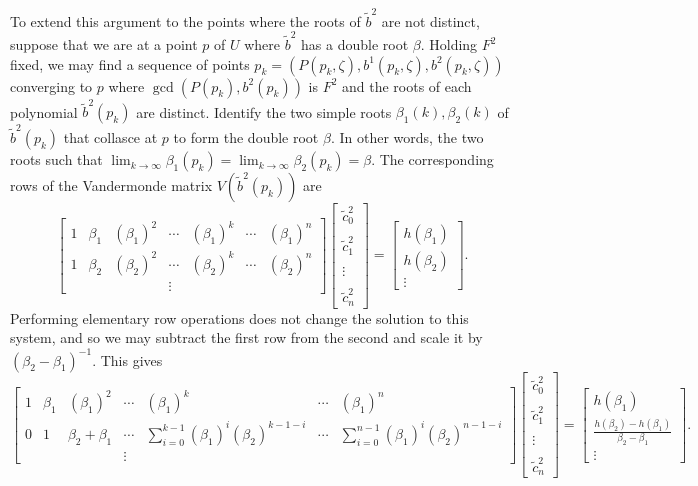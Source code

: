 To extend this argument to the points where the roots of $\tilde{b}^2$ are not distinct, suppose that we are at a point $p$ of $U$ where $\tilde{b}^2$ has a double root $β$. Holding $F^2$ fixed, we may find a sequence of points $p_k = (P(p_k, ζ), b^1(p_k,ζ), b^2(p_k,ζ))$ converging to $p$ where $\gcd(P(p_k),b^2(p_k))$ is $F^2$ and the roots of each polynomial $\tilde{b}^2(p_k)$ are distinct. Identify the two simple roots $β_1(k),β_2(k)$ of $\tilde{b}^2(p_k)$ that collasce at $p$ to form the double root $β$. In other words, the two roots such that $\lim_{k\to\infty} β_1(p_k) = \lim_{k\to\infty} β_2(p_k) = β$. The corresponding rows of the Vandermonde matrix $V(\tilde{b}^2(p_k))$ are
\[
\begin{bmatrix}
1 & β_1 & (β_1)^2 & \cdots & (β_1)^{k} & \cdots & (β_1)^{n} \\
1 & β_2 & (β_2)^2 & \cdots & (β_2)^{k} & \cdots & (β_2)^{n} \\
&&&\vdots&&&
\end{bmatrix}
\begin{bmatrix}
\tilde{c}^2_0 \\~\\ \tilde{c}^2_1 \\~\\ \vdots \\~\\ \tilde{c}^2_n
\end{bmatrix}
=
\begin{bmatrix}
h(β_1) \\
h(β_2) \\
\vdots
\end{bmatrix}.
\]
Performing elementary row operations does not change the solution to this system, and so we may subtract the first row from the second and scale it by $(β_2-β_1)^{-1}$. This gives
\[
\begin{bmatrix}
1 & β_1 & (β_1)^2 & \cdots & (β_1)^{k} & \cdots & (β_1)^{n} \\
0 & 1 & β_2+β_1 & \cdots & \sum_{i=0}^{k-1}(β_1)^i(β_2)^{k-1-i} & \cdots & \sum_{i=0}^{n-1}(β_1)^i(β_2)^{n-1-i} \\
&&&\vdots&&&
\end{bmatrix}
\begin{bmatrix}
\tilde{c}^2_0 \\~\\ \tilde{c}^2_1 \\~\\ \vdots \\~\\ \tilde{c}^2_n
\end{bmatrix}
=
\begin{bmatrix}
h(β_1) \\
\frac{h(β_2) - h(β_1)}{β_2 - β_1} \\
\vdots
\end{bmatrix}.
\]
